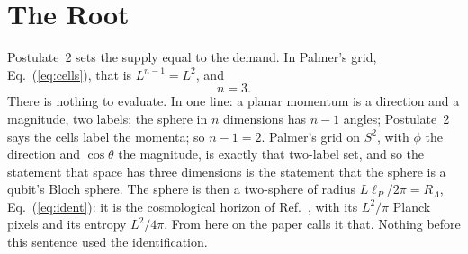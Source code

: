 \documentclass[aps,prd,twocolumn,superscriptaddress,nofootinbib]{revtex4-2}
\begin{document}
\section{The Root}
\label{sec:root}

Postulate~2 sets the supply equal to the demand. In Palmer's grid, Eq.~(\ref{eq:cells}), that is $L^{n-1} = L^2$, and
\begin{equation}
n = 3 .
\label{eq:exact}
\end{equation}
There is nothing to evaluate. In one line: a planar momentum is a direction and a magnitude, two labels; the sphere in $n$ dimensions has $n-1$ angles; Postulate~2 says the cells label the momenta; so $n-1 = 2$. Palmer's grid on $S^2$, with $\phi$ the direction and $\cos\theta$ the magnitude, is exactly that two-label set, and so the statement that space has three dimensions is the statement that the sphere is a qubit's Bloch sphere. The sphere is then a two-sphere of radius $L\ell_P/2\pi = R_\Lambda$, Eq.~(\ref{eq:ident}): it is the cosmological horizon of Ref.~\cite{korytko2026}, with its $L^2/\pi$ Planck pixels and its entropy $L^2/4\pi$. From here on the paper calls it that. Nothing before this sentence used the identification.
\end{document}
